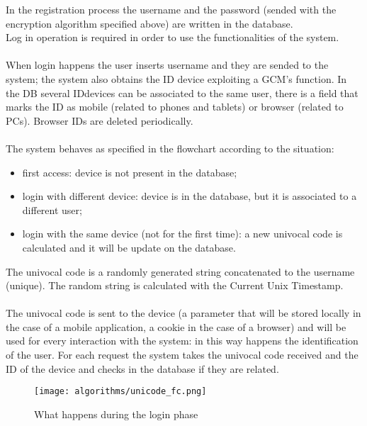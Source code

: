 In the registration process the username and the password (sended with the encryption algorithm specified above) are written in the database.\\
Log in operation is required in order to use the functionalities of the system.
\\\\
When login happens the user inserts username and they are sended to the system; the system also obtains the ID device exploiting a GCM's function. In the DB several IDdevices can be associated to the same user, there is a field that marks the ID as mobile (related to phones and tablets) or browser (related to PCs). Browser IDs are deleted periodically. 
\\\\
The system behaves as specified in the flowchart according to the situation:
\begin{itemize}
\item first access: device is not present in the database;
\item login with different device: device is in the database, but it is associated to a different user;
\item login with the same device (not for the first time): a new univocal code is calculated and it will be update on the database.
\end{itemize}
The univocal code is a randomly generated string concatenated to the username (unique). The random string is calculated with the Current Unix Timestamp.
\\\\
The univocal code is sent to the device (a parameter that will be stored locally in the case of a mobile application, a cookie in the case of a browser) and will be used for every interaction with the system: in this way happens the identification of the user. For each request the system takes the univocal code received and the ID of the device and checks in the database if they are related.
\\
\begin{figure}
	\texttt{[image: algorithms/unicode\_fc.png]}
	\centering
	\caption{What happens during the login phase}
\end{figure}
